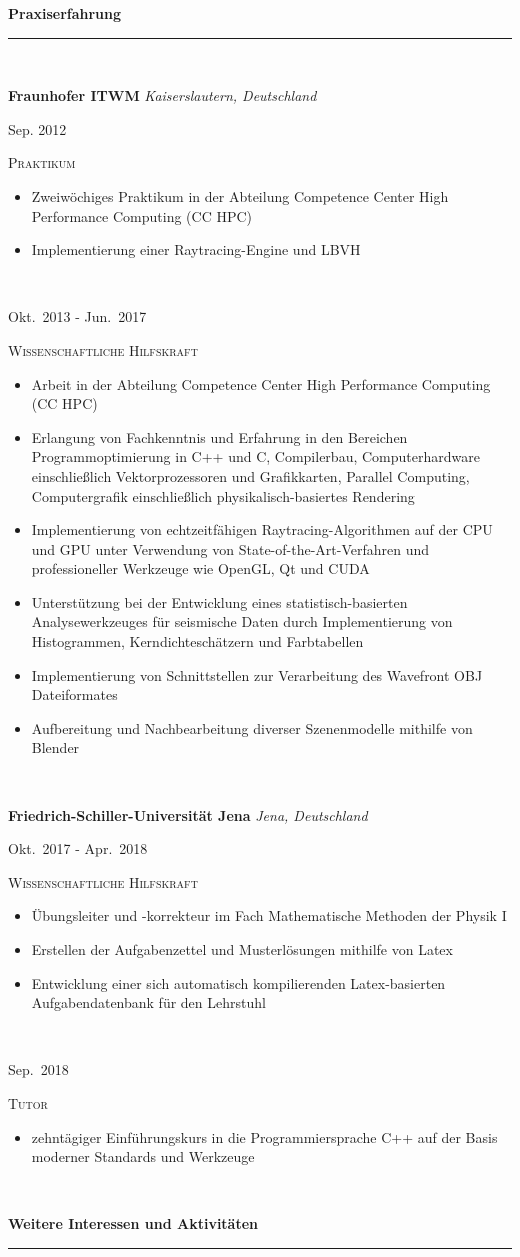 \documentclass[8pt]{article}
\newcommand{\cvSection}[1]{
  {\Large \textbf{#1}}\\
  \rule{\linewidth}{1pt}\\
  \par
}
\newcommand{\cvEducationHeading}[2]{%
  \textbf{#1} \hfill \textit{\footnotesize #2} \\[1em]
}
\newenvironment{cvEducationItem}[2]{
  \begin{minipage}[t]{\textwidth}
  \begin{minipage}[t]{0.1\textwidth}
    \raggedleft
    \small
    #1
  \end{minipage}
  \quad
  \vrule
  \quad
  \begin{minipage}[t]{0.8\textwidth}
    \textsc{\small #2}
    \begin{itemize}
      \itemsep0pt
      \footnotesize
}{
    \end{itemize}
  \end{minipage}
  \end{minipage}\\[1em]
}
\begin{document}
  \cvSection{Praxiserfahrung}
  \cvEducationHeading{Fraunhofer ITWM}{Kaiserslautern, Deutschland}
  \begin{cvEducationItem}{Sep. 2012}{Praktikum}
    \item Zweiwöchiges Praktikum in der Abteilung Competence Center High Performance Computing (CC HPC)
    \item Implementierung einer Raytracing-Engine und LBVH
  \end{cvEducationItem}
  \begin{cvEducationItem}{Okt.~2013 - Jun.~2017}{Wissenschaftliche Hilfskraft}
    \item Arbeit in der Abteilung Competence Center High Performance Computing (CC HPC)
    \item Erlangung von Fachkenntnis und Erfahrung in den Bereichen Programmoptimierung in C++ und C, Compilerbau, Computerhardware einschließlich Vektorprozessoren und Grafikkarten, Parallel Computing, Computergrafik einschließlich physikalisch-basiertes Rendering
    \item Implementierung von echtzeitfähigen Raytracing-Algorithmen auf der CPU und GPU unter Verwendung von State-of-the-Art-Verfahren und professioneller Werkzeuge wie OpenGL, Qt und CUDA
    \item Unterstützung bei der Entwicklung eines statistisch-basierten Analysewerkzeuges für seismische Daten durch Implementierung von Histogrammen, Kerndichteschätzern und Farbtabellen
    \item Implementierung von Schnittstellen zur Verarbeitung des Wavefront OBJ Dateiformates
    \item Aufbereitung und Nachbearbeitung diverser Szenenmodelle mithilfe von Blender
  \end{cvEducationItem}

  \cvEducationHeading{Friedrich-Schiller-Universität Jena}{Jena, Deutschland}
  \begin{cvEducationItem}{Okt.~2017 - Apr.~2018}{Wissenschaftliche Hilfskraft}
    \item Übungsleiter und -korrekteur im Fach Mathematische Methoden der Physik I
    \item Erstellen der Aufgabenzettel und Musterlösungen mithilfe von Latex
    \item Entwicklung einer sich automatisch kompilierenden Latex-basierten Aufgabendatenbank für den Lehrstuhl
  \end{cvEducationItem}
  \begin{cvEducationItem}{Sep.~2018}{Tutor}
    \item zehntägiger Einführungskurs in die Programmiersprache C++ auf der Basis moderner Standards und Werkzeuge
  \end{cvEducationItem}

  \cvSection{Weitere Interessen und Aktivitäten}
\end{document}
